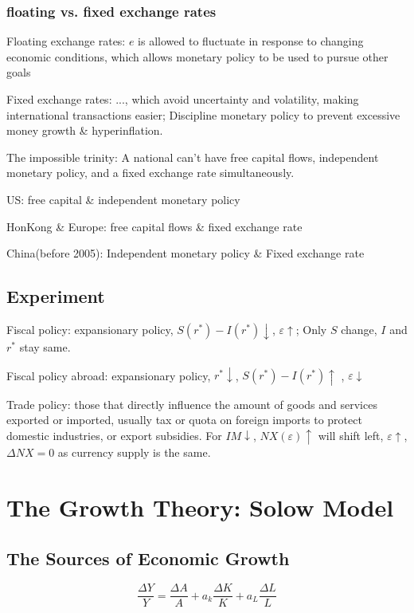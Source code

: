 \documentclass[10pt, a4paper]{article}
\begin{document}
    \subsubsection{floating vs. fixed exchange rates}
        Floating exchange rates: $e$ is allowed to fluctuate in response to changing economic conditions, which allows monetary policy to be used to pursue other goals  

        Fixed exchange rates: ..., which avoid uncertainty and volatility, making international transactions easier; Discipline monetary policy to prevent excessive money growth \& hyperinflation. 

        The impossible trinity: A national can't have free capital flows, independent monetary policy, and a fixed exchange rate simultaneously. 

            \quad US: free capital \& independent monetary policy 

            \quad HonKong \& Europe: free capital flows \& fixed exchange rate 

            \quad China(before 2005): Independent monetary policy \& Fixed exchange rate 
    \subsection{Experiment}
        Fiscal policy: expansionary policy, $S(r^*) - I(r^*) \downarrow$, $\varepsilon \uparrow$; Only $S$ change, $I$ and $r^*$ stay same. 

        Fiscal policy abroad: expansionary policy, $r^* \downarrow$, $S(r^*) - I(r^*) \uparrow$ , $\varepsilon \downarrow$ 

        Trade policy: those that directly influence the amount of goods and services exported or imported, usually tax or quota on foreign imports to protect domestic industries, or export subsidies. For $IM \downarrow$, $NX(\varepsilon) \uparrow$ will shift left, $\varepsilon \uparrow$, $\Delta NX  = 0$ as currency supply is the same. 

\section{The Growth Theory: Solow Model}
    \subsection{The Sources of Economic Growth}
        $$\frac{\Delta Y}{Y} = \frac{\Delta A}{A} + a_k\frac{\Delta K}{K} + a_L\frac{\Delta L}{L}$$
\end{document}
